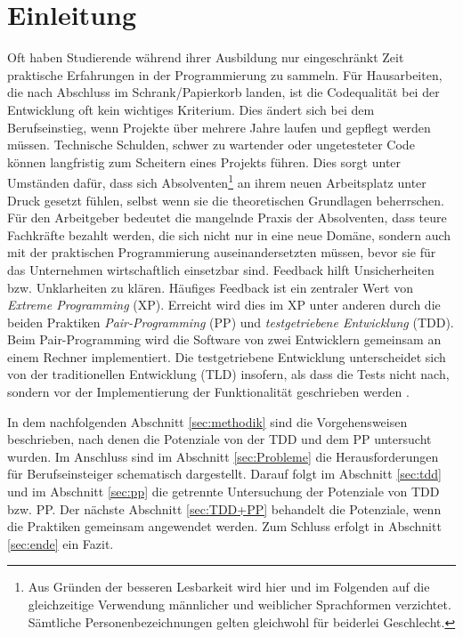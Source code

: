 
\section{Einleitung}

Oft haben Studierende während ihrer Ausbildung nur eingeschränkt Zeit praktische Erfahrungen in der Programmierung zu sammeln. Für Hausarbeiten, die nach Abschluss im Schrank/Papierkorb landen, ist die Codequalität bei der Entwicklung oft kein wichtiges Kriterium. Dies ändert sich bei dem Berufseinstieg, wenn Projekte über mehrere Jahre laufen und gepflegt werden müssen. Technische Schulden, schwer zu wartender oder ungetesteter Code können langfristig zum Scheitern eines Projekts führen. Dies sorgt unter Umständen dafür, dass sich Absolventen\footnote{Aus Gründen der besseren Lesbarkeit wird hier und im Folgenden auf die gleichzeitige Verwendung männlicher und weiblicher Sprachformen verzichtet. Sämtliche Personenbezeichnungen gelten gleichwohl für beiderlei Geschlecht.} an ihrem neuen Arbeitsplatz unter Druck gesetzt fühlen, selbst wenn sie die theoretischen Grundlagen beherrschen. Für den Arbeitgeber bedeutet die mangelnde Praxis der Absolventen, dass teure Fachkräfte bezahlt werden, die sich nicht nur in eine neue Domäne, sondern auch mit der praktischen Programmierung auseinandersetzten müssen, bevor sie für das Unternehmen wirtschaftlich einsetzbar sind. Feedback hilft Unsicherheiten bzw. Unklarheiten zu klären. Häufiges Feedback ist ein zentraler Wert von \textit{Extreme Programming} (XP). Erreicht wird dies im XP unter anderen durch die beiden Praktiken \textit{Pair-Programming} (PP) und \textit{testgetriebene Entwicklung} (TDD). Beim Pair-Programming wird die Software von zwei Entwicklern gemeinsam an einem Rechner implementiert. Die testgetriebene Entwicklung unterscheidet sich von der traditionellen Entwicklung (TLD) insofern, als dass die Tests nicht nach, sondern vor der Implementierung der Funktionalität geschrieben werden \cite{Beck2004ExtremeChange}.

In dem nachfolgenden Abschnitt \ref{sec:methodik} sind die Vorgehensweisen beschrieben, nach denen die Potenziale von der TDD und dem PP untersucht wurden. Im Anschluss sind im Abschnitt \ref{sec:Probleme} die Herausforderungen für Berufseinsteiger schematisch dargestellt. Darauf folgt im Abschnitt \ref{sec:tdd} und im Abschnitt \ref{sec:pp} die getrennte Untersuchung der Potenziale von TDD bzw. PP. Der nächste Abschnitt \ref{sec:TDD+PP} behandelt die Potenziale, wenn die Praktiken gemeinsam angewendet werden. Zum Schluss erfolgt in Abschnitt \ref{sec:ende} ein Fazit.
